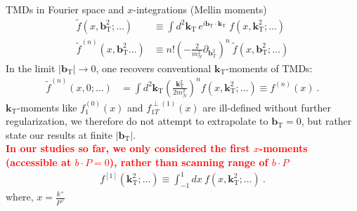 \documentclass[aspectratio=169, 9pt]{beamer}
\newcommand{\tcdot}{{\cdot}}
\newcommand{\vect}[1]{\ensuremath{\boldsymbol{#1}}}
\newcommand{\vprp}[1]{\vect{#1}_{\mathrm T}}
\newcommand{\TMDs}{TMDs\xspace}
\newcommand{\bvec}{b}
\newcommand{\mN}{m_N}
\newcommand{\kei}{k}
\newcommand{\zetahat}{{\hat \zeta}}
\begin{document}
\begin{frame}{TMDs in Fourier space and $x$-integrations (Mellin moments)}
\begin{align}
    \tilde f(x, \vprp{\bvec}^2;\ldots) & \equiv \int  d^2 \vprp{\kei} \, e^{i \vprp{\bvec} \cdot \vprp{\kei} }\; f(x, \vprp{\kei}^2;\ldots)\\
    \tilde f^{(n)}(x, \vprp{\bvec}^2\ldots ) & \equiv n!\left( -\frac{2}{\mN^2}\partial_{\vprp{\bvec}^2} \right)^n \ 
	\tilde f(x, \vprp{\bvec}^2;\ldots ) 
\end{align}
 In the limit $|\vprp{\bvec}| \rightarrow 0$, one recovers conventional $\vprp{\kei}$-moments of \TMDs:
\begin{align}
	\tilde f^{(n)}(x, 0;\ldots ) & = \int  d^2 \vprp{\kei} \left( \frac{\vprp{\kei}^2}{2 \mN^2 }\right)^n  f(x, \vprp{\kei}^2;\ldots ) \equiv  f^{(n)}(x)\ .
	\label{eq-btder2}
\end{align}
$\vprp{\kei}$-moments like $f_1^{(0)}(x)$ and $f_{1T}^{\perp(1)}(x)$ are ill-defined without further regularization, we therefore do not attempt to extrapolate to $\vprp{\bvec}=0$, but rather state our results at finite $|\vprp{\bvec}|$.\\

\textcolor{red}{\textbf{In our studies so far, we only considered the first $x$-moments (accessible at $b \cdot P = 0$), rather than scanning range
of $b \cdot P$}}
\begin{align}
	f^{[1]}(\vprp{\kei}^2;\ldots) \equiv \int_{-1}^1 dx\ f(x,\vprp{\kei}^2;\ldots)\ .
\end{align}
where, $x=\frac{k^{+}}{P^{+}}$
\end{frame}

\end{document}
